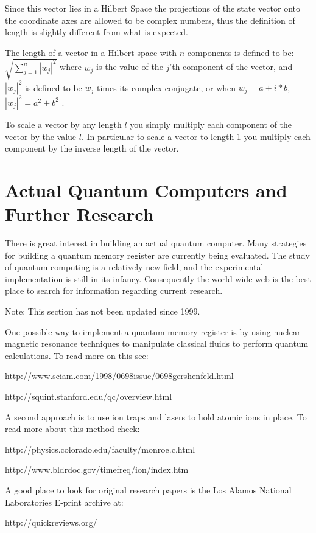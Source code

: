 \documentclass[]{article}
\begin{document}
Since this vector lies in a Hilbert Space the projections of the state
vector onto the coordinate axes are allowed to be complex numbers,
thus the definition of length is slightly different from what is
expected.

The length of a vector in a Hilbert space with $n$ components
is defined to be: $\sqrt{\sum_{j = 1}^{n}|w_{j}|^{2}}$ where $w_{j}$
is the value of the $j$'th component of the vector, and $|w_{j}|^{2}$
is defined to be $w_{j}$ times its complex conjugate, or when $w_{j} = a + i * b$, $|w_{j}|^{2} = a^{2} + b^{2}$
.
	
To scale a vector by any length $l$ you simply multiply each component
of the vector by the value $l$.  In particular to scale a vector to
length 1 you multiply each component by the inverse length of the
vector.

\section{Actual Quantum Computers and Further Research}

There is great interest in building an actual quantum computer.  Many
strategies for building a quantum memory register are currently being
evaluated.  The study of quantum computing is a relatively new field,
and the experimental implementation is still in its infancy.
Consequently the world wide web is the best place to search for
information regarding current research.

Note: This section has not been updated since 1999.

One possible way to implement a quantum memory register is by using
nuclear magnetic resonance techniques to manipulate classical fluids
to perform quantum calculations.  To read more on this see:

	http://www.sciam.com/1998/0698issue/0698gershenfeld.html

	http://squint.stanford.edu/qc/overview.html

A second approach is to use ion traps and lasers to hold atomic ions
in place.  To read more about this method check:

	http://physics.colorado.edu/faculty/monroe.c.html

	http://www.bldrdoc.gov/timefreq/ion/index.htm

A good place to look for original research papers is the Los Alamos
National Laboratories E-print archive at:

	http://quickreviews.org/
\end{document}

